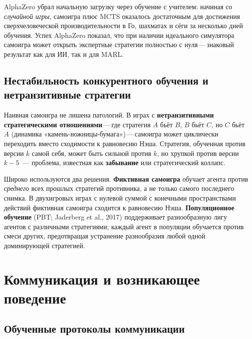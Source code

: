 AlphaZero убрал начальную загрузку через обучение с учителем:
начиная со \emph{случайной игры}, самоигра плюс MCTS
оказалось достаточным для достижения сверхчеловеческой производительности в Го, шахматах
и сёги за несколько дней обучения. Успех AlphaZero
показал, что при наличии идеального симулятора самоигра может открыть
экспертные стратегии полностью с нуля\,---\,знаковый результат как для
ИИ, так и для MARL.

\subsection{Нестабильность конкурентного обучения и нетранзитивные стратегии}

Наивная самоигра не лишена патологий. В играх с
\textbf{нетранзитивными стратегическими отношениями}\,---\,где стратегия
$A$ бьёт $B$, $B$ бьёт $C$, но $C$ бьёт $A$ (динамика «камень-ножницы-бумага»)\,---\,самоигра может циклически переходить вместо сходимости
к равновесию Нэша. Стратегия, обученная против версии $k$ самой себя,
может быть сильной против $k$, но хрупкой против версии $k-5$~--- проблема,
известная как \textbf{забывание} или
стратегический коллапс.

Широко используются два решения. \textbf{Фиктивная
самоигра} обучает агента против
\emph{среднего} всех прошлых стратегий противника, а не только самого последнего
снимка. В двухигровых играх с нулевой суммой с конечными пространствами действий
фиктивная самоигра сходится к равновесию Нэша.
\textbf{Популяционное обучение}
(PBT; Jaderberg et al., 2017) поддерживает разнообразную лигу агентов с
различными стратегиями; каждый агент в популяции обучается против
смеси других, предотвращая устранение разнообразия любой одной доминирующей стратегией.

\section{Коммуникация и возникающее поведение}
\label{sec:communication}

\subsection{Обученные протоколы коммуникации}

